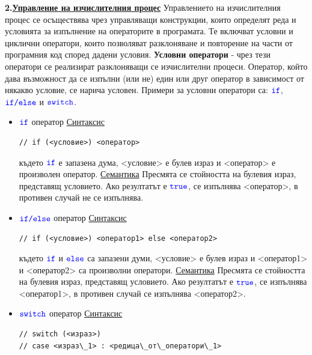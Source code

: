 \documentclass{article}
\begin{document}
\textbf{2.\underline{Управление на изчислителния процес}} \newline\newline
Управлението на изчислителния процес се осъществява чрез управляващи конструкции, които определят реда и условията за изпълнение на операторите в
програмата. Те включват условни и циклични оператори, които позволяват разклоняване и повторение на части от програмния код според дадени условия. \newline\newline
\textbf{Условни оператори} - чрез тези оператори се реализират разклоняващи се изчислителни процеси. Оператор, който дава възможност да се изпълни (или не)
един или друг оператор в зависимост от някакво условие, се нарича условен. Примери за условни оператори са: $\textcolor{blue}{\texttt{if}}$, $\textcolor{blue}{\texttt{if/else}}$ и $\textcolor{blue}{\texttt{switch}}$.
\begin{itemize}
    \item $\textcolor{blue}{\texttt{if}}$ оператор \newline
\underline{Синтаксис}
\begin{lstlisting}[style=cpp]
// if (<условие>) <оператор>
\end{lstlisting}
където $\textcolor{blue}{\texttt{if}}$ е запазена дума, <условие> е булев израз и <оператор> е произволен оператор. \newline
\underline{Семантика} \newline
Пресмята се стойността на булевия израз, представящ условието. Ако резултатът е $\textcolor{blue}{\texttt{true}}$, се изпълнява <оператор>, в противен случай
не се изпълнява.
    \item $\textcolor{blue}{\texttt{if/else}}$ оператор \newline
\underline{Синтаксис}
\begin{lstlisting}[style=cpp]
// if (<условие>) <оператор1> else <оператор2>
\end{lstlisting}
където $\textcolor{blue}{\texttt{if}}$ и $\textcolor{blue}{\texttt{else}}$ са запазени думи, <условие> е булев израз и <оператор1> и <оператор2> са произволни оператори. \newline
\underline{Семантика} \newline
Пресмята се стойността на булевия израз, представящ условието. Ако резултатът е $\textcolor{blue}{\texttt{true}}$, се изпълнява <оператор1>, в противен случай
се изпълнява <оператор2>.
    \item $\textcolor{blue}{\texttt{switch}}$ оператор \newline
\underline{Синтаксис}
\begin{lstlisting}[style=cpp]
// switch (<израз>)
// case <израз\_1> : <редица\_от\_оператори\_1>

\end{lstlisting}
\end{itemize}
\end{document}
